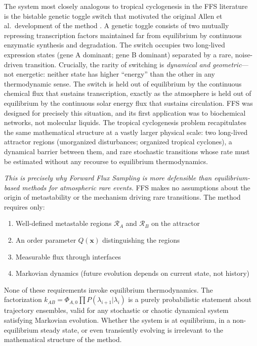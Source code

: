 \documentclass[11pt]{article}
\begin{document}
The system most closely analogous to tropical cyclogenesis in the FFS literature is the bistable genetic toggle switch that motivated the original Allen et al.\ development of the method \citep{allen2005sampling}. A genetic toggle consists of two mutually repressing transcription factors maintained far from equilibrium by continuous enzymatic synthesis and degradation. The switch occupies two long-lived expression states (gene A dominant; gene B dominant) separated by a rare, noise-driven transition. Crucially, the rarity of switching is \textit{dynamical and geometric}---not energetic: neither state has higher ``energy'' than the other in any thermodynamic sense. The switch is held out of equilibrium by the continuous chemical flux that sustains transcription, exactly as the atmosphere is held out of equilibrium by the continuous solar energy flux that sustains circulation. FFS was designed for precisely this situation, and its first application \citep{allen2005sampling} was to biochemical networks, not molecular liquids. The tropical cyclogenesis problem recapitulates the same mathematical structure at a vastly larger physical scale: two long-lived attractor regions (unorganized disturbances; organized tropical cyclones), a dynamical barrier between them, and rare stochastic transitions whose rate must be estimated without any recourse to equilibrium thermodynamics.

\textit{This is precisely why Forward Flux Sampling is more defensible than equilibrium-based methods for atmospheric rare events.} FFS makes no assumptions about the origin of metastability or the mechanism driving rare transitions. The method requires only:

\begin{enumerate}
    \item Well-defined metastable regions $\mathcal{R}_A$ and $\mathcal{R}_B$ on the attractor
    \item An order parameter $Q(\mathbf{x})$ distinguishing the regions
    \item Measurable flux through interfaces
    \item Markovian dynamics (future evolution depends on current state, not history)
\end{enumerate}

None of these requirements invoke equilibrium thermodynamics. The factorization $k_{AB} = \Phi_{A,0} \prod P(\lambda_{i+1}|\lambda_i)$ is a purely probabilistic statement about trajectory ensembles, valid for any stochastic or chaotic dynamical system satisfying Markovian evolution. Whether the system is at equilibrium, in a non-equilibrium steady state, or even transiently evolving is irrelevant to the mathematical structure of the method.
\end{document}
